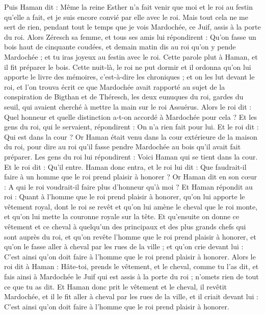 \begin{multicols}{2}
Puis Haman dit : Même la reine Esther n'a fait venir que moi et le roi au festin qu'elle a fait, et je suis encore convié par elle avec le roi.
Mais tout cela ne me sert de rien, pendant tout le temps que je vois Mardochée, ce Juif, assis à la porte du roi.
Alors Zéresch sa femme, et tous ses amis lui répondirent : Qu'on fasse un bois haut de cinquante coudées, et demain matin dis au roi qu'on y pende Mardochée ; et tu iras joyeux au festin avec le roi. Cette parole plut à Haman, et il fit préparer le bois.
\VerseOne{}Cette nuit-là, le roi ne put dormir et il ordonna qu'on lui apporte le livre des mémoires, c'est-à-dire les chroniques ; et on les lut devant le roi,
et l'on trouva écrit ce que Mardochée avait rapporté au sujet de la conspiration de Bigthan et de Théresch, les deux eunuques du roi, gardes du seuil, qui avaient cherché à mettre la main sur le roi Assuérus.
Alors le roi dit : Quel honneur et quelle distinction a-t-on accordé à Mardochée pour cela ? Et les gens du roi, qui le servaient, répondirent : On n'a rien fait pour lui.
Et le roi dit : Qui est dans la cour ? Or Haman était venu dans la cour extérieure de la maison du roi, pour dire au roi qu'il fasse pendre Mardochée au bois qu'il avait fait préparer.
Les gens du roi lui répondirent : Voici Haman qui se tient dans la cour. Et le roi dit : Qu'il entre.
Haman donc entra, et le roi lui dit : Que faudrait-il faire à un homme que le roi prend plaisir à honorer ? Or Haman dit en son cœur : A qui le roi voudrait-il faire plus d'honneur qu'à moi ?
Et Haman répondit au roi : Quant à l'homme que le roi prend plaisir à honorer,
qu'on lui apporte le vêtement royal, dont le roi se revêt et qu'on lui amène le cheval que le roi monte, et qu'on lui mette la couronne royale sur la tête.
Et qu'ensuite on donne ce vêtement et ce cheval à quelqu'un des principaux et des plus grands chefs qui sont auprès du roi, et qu'on revête l'homme que le roi prend plaisir à honorer, et qu'on le fasse aller à cheval par les rues de la ville ; et qu'on crie devant lui : C'est ainsi qu'on doit faire à l'homme que le roi prend plaisir à honorer.
Alors le roi dit à Haman : Hâte-toi, prends le vêtement, et le cheval, comme tu l'as dit, et fais ainsi à Mardochée le Juif qui est assis à la porte du roi ; n'omets rien de tout ce que tu as dit.
Et Haman donc prit le vêtement et le cheval, il revêtit Mardochée, et il le fit aller à cheval par les rues de la ville, et il criait devant lui : C'est ainsi qu'on doit faire à l'homme que le roi prend plaisir à honorer.

\end{multicols}
